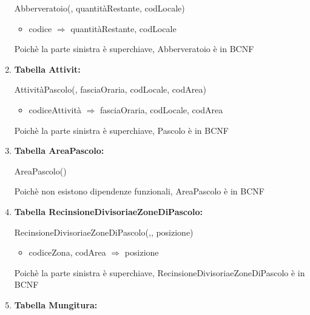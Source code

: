 \documentclass[12pt,a4paper]{article}
\begin{document}
\begin{enumerate}
Abberveratoio(\underline{}, quantitàRestante,  codLocale)
\begin{itemize}
\vspace{-5pt}
\item codice $\Rightarrow$ quantitàRestante, codLocale
\vspace{-5pt}
\end{itemize}
Poichè la parte sinistra è superchiave, Abberveratoio è in BCNF
\vspace{10pt}



\item[] \textbf{Tabella Attivit:}

AttivitàPascolo(\underline{}, fasciaOraria,  codLocale,  codArea)
\begin{itemize}
\vspace{-5pt}
\item codiceAttività $\Rightarrow$ fasciaOraria, codLocale, codArea
\vspace{-5pt}
\end{itemize}
Poichè la parte sinistra è superchiave, Pascolo è in BCNF
\vspace{10pt}



\item[] \textbf{Tabella AreaPascolo:}

AreaPascolo(\underline{})

Poichè non esistono dipendenze funzionali, AreaPascolo è in BCNF
\vspace{10pt}



\item[] \textbf{Tabella RecinsioneDivisoriaeZoneDiPascolo:}

RecinsioneDivisoriaeZoneDiPascolo(\underline{},\underline{}, posizione)
\begin{itemize}
\vspace{-5pt}
\item codiceZona, codArea $\Rightarrow$ posizione
\vspace{-5pt}
\end{itemize}
Poichè la parte sinistra è superchiave, RecinsioneDivisoriaeZoneDiPascolo è in BCNF
\vspace{10pt}



\item[] \textbf{Tabella Mungitura:}


\end{enumerate}
\end{document}
